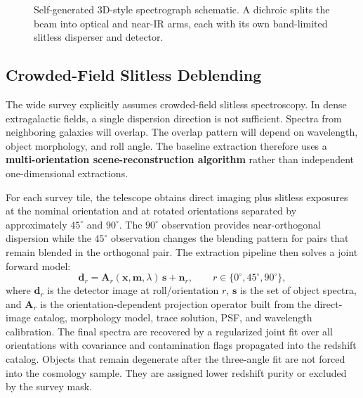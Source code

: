 \documentclass[10pt,onecolumn]{article}
\begin{document}
\begin{figure}[tp]
\caption{Self-generated 3D-style spectrograph schematic. A dichroic splits the beam into optical and near-IR arms, each with its own band-limited slitless disperser and detector.}
\label{fig:spectrograph}
\end{figure}

\subsection{Crowded-Field Slitless Deblending}\label{sec:deblending}

The wide survey explicitly assumes crowded-field slitless spectroscopy. In dense extragalactic fields, a single dispersion direction is not sufficient. Spectra from neighboring galaxies will overlap. The overlap pattern will depend on wavelength, object morphology, and roll angle. The baseline extraction therefore uses a \textbf{multi-orientation scene-reconstruction algorithm} rather than independent one-dimensional extractions.

For each survey tile, the telescope obtains direct imaging plus slitless exposures at the nominal orientation and at rotated orientations separated by approximately $45^\circ$ and $90^\circ$. The $90^\circ$ observation provides near-orthogonal dispersion while the $45^\circ$ observation changes the blending pattern for pairs that remain blended in the orthogonal pair. The extraction pipeline then solves a joint forward model:
\begin{equation}
  \mathbf{d}_{r}=\mathbf{A}_{r}(\mathbf{x},\mathbf{m},\lambda)\,\mathbf{s}+\mathbf{n}_{r},
  \qquad r\in\{0^\circ,45^\circ,90^\circ\},
  \label{eq:scene}
\end{equation}
where $\mathbf{d}_{r}$ is the detector image at roll/orientation $r$, $\mathbf{s}$ is the set of object spectra, and $\mathbf{A}_{r}$ is the orientation-dependent projection operator built from the direct-image catalog, morphology model, trace solution, PSF, and wavelength calibration. The final spectra are recovered by a regularized joint fit over all orientations with covariance and contamination flags propagated into the redshift catalog. Objects that remain degenerate after the three-angle fit are not forced into the cosmology sample. They are assigned lower redshift purity or excluded by the survey mask.
\end{document}
